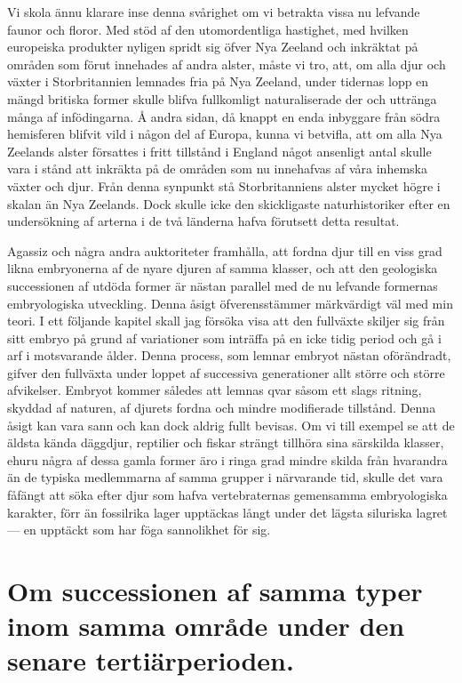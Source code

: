 Vi skola ännu klarare inse denna svårighet om vi betrakta vissa nu lefvande faunor och floror. Med stöd af den utomordentliga hastighet, med hvilken europeiska produkter nyligen spridt sig öfver Nya Zeeland och inkräktat på områden som förut innehades af andra alster, måste vi tro, att, om alla djur och växter i Storbritannien lemnades fria på Nya Zeeland, under tidernas lopp en mängd britiska former skulle blifva fullkomligt naturaliserade der och uttränga många af infödingarna. Å andra sidan, då knappt en enda inbyggare från södra hemisferen blifvit vild i någon del af Europa, kunna vi betvifla, att om alla Nya Zeelands alster försattes i fritt tillstånd i England något ansenligt antal skulle vara i stånd att inkräkta på de områden som nu innehafvas af våra inhemska växter och djur. Från denna synpunkt stå Storbritanniens alster mycket högre i skalan än Nya Zeelands. Dock skulle icke den skickligaste naturhistoriker efter en undersökning af arterna i de två länderna hafva förutsett detta resultat.

Agassiz och några andra auktoriteter framhålla, att fordna djur till en viss grad likna embryonerna af de nyare djuren af samma klasser, och att den geologiska successionen af utdöda former är nästan parallel med de nu lefvande formernas embryologiska utveckling. Denna åsigt öfverensstämmer märkvärdigt väl med min teori. I ett följande kapitel skall jag försöka visa att den fullväxte skiljer sig från sitt embryo på grund af variationer som inträffa på en icke tidig period och gå i arf i motsvarande ålder. Denna process, som lemnar embryot nästan oförändradt, gifver den fullväxta under loppet af successiva generationer allt större och större afvikelser. Embryot kommer således att lemnas qvar såsom ett slags ritning, skyddad af naturen, af djurets fordna och mindre modifierade tillstånd. Denna åsigt kan vara sann och kan dock aldrig fullt bevisas. Om vi till exempel se att de äldsta kända däggdjur, reptilier och fiskar strängt tillhöra sina särskilda klasser, ehuru några af dessa gamla former äro i ringa grad mindre skilda från hvarandra än de typiska medlemmarna af samma grupper i närvarande tid, skulle det vara fåfängt att söka efter djur som hafva vertebraternas gemensamma embryologiska karakter, förr än fossilrika lager upptäckas långt under det lägsta siluriska lagret — en upptäckt som har föga sannolikhet för sig.



\section[Senare tertiärperioden]{Om successionen af samma typer inom samma område
under den senare tertiärperioden.}

